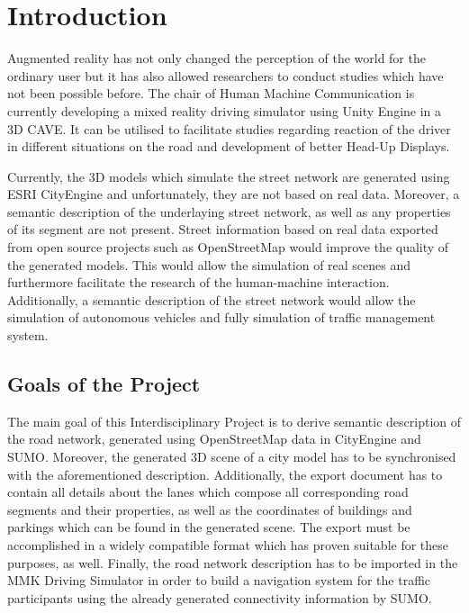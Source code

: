 \chapter{Introduction}
\label{ch:introduction}
Augmented reality has not only changed the perception of the world for the ordinary user but it has also allowed researchers to conduct studies which have not been possible before. The chair of Human Machine Communication is currently developing a mixed reality driving simulator using Unity Engine in a 3D CAVE. It can be utilised to facilitate studies regarding reaction of the driver in different situations on the road and development of better Head-Up Displays.

Currently, the 3D models which simulate the street network are generated using ESRI CityEngine and unfortunately, they are not based on real data. Moreover, a semantic description of the underlaying street network, as well as any properties of its segment are not present. Street information based on real data exported from open source projects such as OpenStreetMap would improve the quality of the generated models. This would allow the simulation of real scenes and furthermore facilitate the research of the human-machine interaction. Additionally, a semantic description of the street network would allow the simulation of autonomous vehicles and fully simulation of traffic management system. 
 
\section{Goals of the Project}
\label{sec:goals}
The main goal of this Interdisciplinary Project is to derive semantic description of the road network, generated using OpenStreetMap data in CityEngine and SUMO. Moreover, the generated 3D scene of a city model has to be synchronised with the aforementioned description. Additionally, the export document has to contain all details about the lanes which compose all corresponding road segments and their properties, as well as the coordinates of buildings and parkings which can be found in the generated scene. The export must be accomplished in a widely compatible format which has proven suitable for these purposes, as well. Finally, the road network description has to be imported in the MMK Driving Simulator in order to build a navigation system for the traffic participants using the already generated connectivity information by SUMO.

